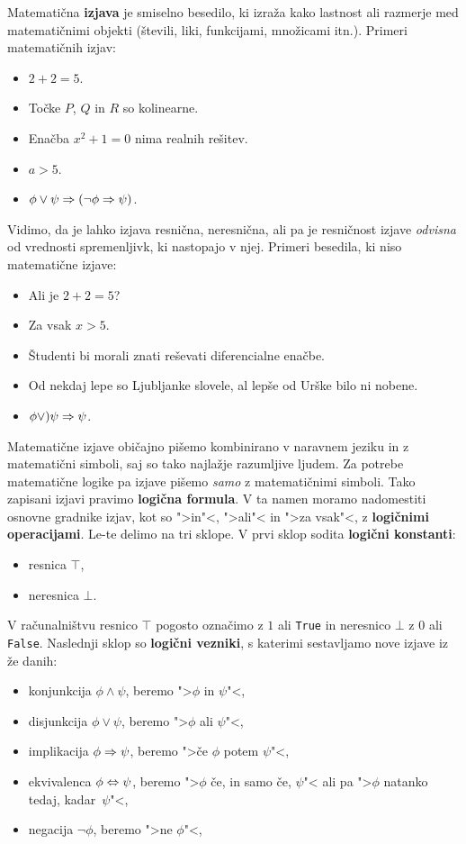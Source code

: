 Matematična \textbf{izjava} je smiselno besedilo, ki izraža kako lastnost ali
razmerje med matematičnimi objekti (števili, liki, funkcijami, množicami
itn.). Primeri matematičnih izjav:
%
\begin{itemize}
\item $2 + 2 = 5$.
\item Točke $P$, $Q$ in $R$ so kolinearne.
\item Enačba $x^2 + 1 = 0$ nima realnih rešitev.
\item $a > 5$.
\item $\phi \lor \psi \Rightarrow (\lnot \phi \Rightarrow \psi)$.
\end{itemize}
%
Vidimo, da je lahko izjava resnična, neresnična, ali pa je resničnost
izjave \emph{odvisna} od vrednosti spremenljivk, ki nastopajo v njej.
Primeri besedila, ki niso matematične izjave:
%
\begin{itemize}
\item Ali je $2 + 2 = 5$?
\item Za vsak $x > 5$.
\item Študenti bi morali znati reševati diferencialne enačbe.
\item Od nekdaj lepe so Ljubljanke slovele, al lepše od Urške bilo ni nobene.
\item $\phi \lor ) \psi \Rightarrow \psi$.
\end{itemize}
%
Matematične izjave običajno pišemo kombinirano v naravnem jeziku in z
matematični simboli, saj so tako najlažje razumljive ljudem. Za
potrebe matematične logike pa izjave pišemo \emph{samo} z
matematičnimi simboli. Tako zapisani izjavi pravimo \textbf{logična
  formula}. V ta namen moramo nadomestiti osnovne gradnike izjav, kot
so ">in"<, ">ali"< in ">za vsak"<, z \textbf{logičnimi operacijami}.
Le-te delimo na tri sklope. V prvi sklop sodita \textbf{logični
  konstanti}:
%
\begin{itemize}
\item resnica $\top$,
\item neresnica $\bot$.
\end{itemize}
%
V računalništvu resnico $\top$ pogosto označimo z $1$ ali \texttt{True} in
neresnico $\bot$ z $0$ ali \texttt{False}. Naslednji sklop so \textbf{logični
vezniki}, s katerimi sestavljamo nove izjave iz že danih:
%
\begin{itemize}
\item konjunkcija $\phi \land \psi$, beremo ">$\phi$ in $\psi$"<,
\item disjunkcija $\phi \lor \psi$, beremo ">$\phi$ ali $\psi$"<,
\item implikacija $\phi \Rightarrow \psi$, beremo ">če $\phi$ potem $\psi$"<,
\item ekvivalenca $\phi \Leftrightarrow \psi$, beremo ">$\phi$ če, in samo če, $\psi$"< ali pa ">$\phi$ natanko tedaj, kadar~$\psi$"<,
\item negacija $\lnot \phi$, beremo ">ne $\phi$"<,
\end{itemize}
